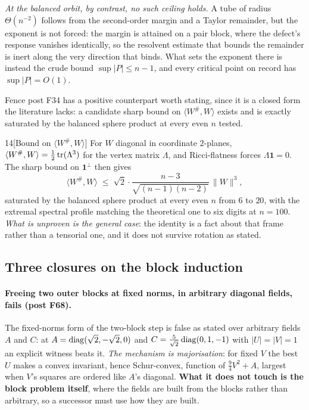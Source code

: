\emph{At the balanced orbit, by contrast, no such ceiling holds.} A tube of radius $\Theta(n^{-2})$ follows from the second-order margin and a Taylor remainder, but the exponent is not forced: the margin is attained on a pair block, where the defect's response vanishes identically, so the resolvent estimate that bounds the remainder is inert along the very direction that binds. What sets the exponent there is instead the crude bound $\sup\lvert P\rvert\le n-1$, and every critical point on record has $\sup\lvert P\rvert=O(1)$.

Fence post F34 has a positive counterpart worth stating, since it is a closed form the literature lacks: a candidate sharp bound on $\langle W^{\#},W\rangle$ exists and is exactly saturated by the balanced sphere product at every even $n$ tested.

\begin{Conj}{14}[Bound on $\langle W^{\#},W\rangle$]
For $W$ diagonal in coordinate $2$-planes, $\langle W^{\#},W\rangle=\tfrac12\operatorname{tr}(\Lambda^3)$ for the vertex matrix $\Lambda$, and Ricci-flatness forces $\Lambda\mathbf1=0$. The sharp bound on $\mathbf1^\perp$ then gives
\[
\langle W^{\#},W\rangle\;\le\;\sqrt2\cdot\frac{n-3}{\sqrt{(n-1)(n-2)}}\,\|W\|^3 ,
\]
saturated by the balanced sphere product at every even $n$ from $6$ to $20$, with the extremal spectral profile matching the theoretical one to six digits at $n=100$. \emph{What is unproven is the general case}: the identity is a fact about that frame rather than a tensorial one, and it does not survive rotation as stated.
\end{Conj}

\subsection{Three closures on the block induction}\label{sec:blockfences}

\paragraph{Freeing two outer blocks at fixed norms, in arbitrary diagonal fields, fails (post F68).} The fixed-norms form of the two-block step is false as stated over arbitrary fields $A$ and $C$: at $A=\operatorname{diag}(\sqrt2,-\sqrt2,0)$ and $C=\tfrac5{\sqrt2}\operatorname{diag}(0,1,-1)$ with $\lvert U\rvert=\lvert V\rvert=1$ an explicit witness beats it. \emph{The mechanism is majorisation}: for fixed $V$ the best $U$ makes a convex invariant, hence Schur-convex, function of $\tfrac94V^2+A$, largest when $V$'s squares are ordered like $A$'s diagonal. \textbf{What it does not touch is the block problem itself}, where the fields are built from the blocks rather than arbitrary, so a successor must use how they are built.

